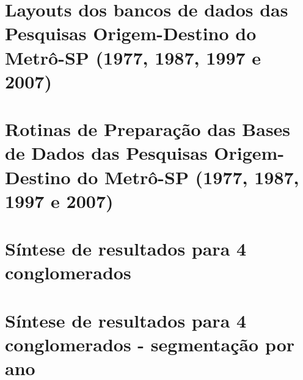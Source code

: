 \chapter{Layouts dos bancos de dados das Pesquisas Origem-Destino do Metrô-SP (1977, 1987, 1997 e 2007)}\label{chap:anexo_layouts}




\chapter{Rotinas de Preparação das Bases de Dados das Pesquisas Origem-Destino do Metrô-SP (1977, 1987, 1997 e 2007)}\label{chap:anexo_rotinas}




\chapter{Síntese de resultados para 4 conglomerados}\label{chap:anexo_4_clusters_td}

\chapter{Síntese de resultados para 4 conglomerados - segmentação por ano}\label{chap:anexo_4_clusters_fam}


